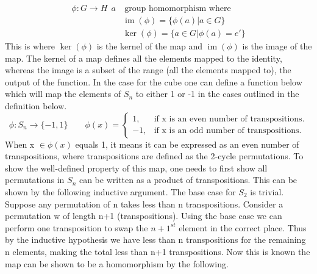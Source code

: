 \documentclass{article}
\newcounter{prop}[section]\setcounter{prop}{0}
\newcounter{lem}[section]\setcounter{lem}{0}
\DeclareMathOperator{\imF}{im}
\DeclareMathOperator{\kerF}{ker}
\begin{document}
\begin{align*}
\phi : G\rightarrow H\ \ a&\ \text{group homomorphism where}\\
&\imF(\phi) = \{\phi(a) | a \in G\}\\
&\kerF(\phi)= \{a\in G |\phi(a) = e'\}
\end{align*}
This is where $\kerF(\phi)$ is the kernel of the map and $\imF(\phi)$ is the image of the map. The kernel of a map defines all the elements mapped to the identity, whereas the image is a subset of the range (all the elements mapped to), the output of the function.
In the case for the cube one can define a function below which will map the elements of $S_{n}$ to either 1 or -1 in the cases outlined in the definition below.
\begin{equation}
\phi : S_{n} \rightarrow \{-1,1\} \qquad
  \phi(x)=\begin{cases}
    1, & \text{if x is an even number of transpositions}.\\
    -1, & \text{if x is an odd number of transpositions}.
  \end{cases}
\end{equation}
When x $\in \phi(x)$ equals 1, it means it can be expressed as an even number of transpositions, where transpositions are defined as the 2-cycle permutations. To show the well-defined property of this map, one needs to first show all permutations in $S_{n}$ can be written as a product of transpositions.%
This can be shown by the following inductive argument. The base case for $S_{2}$ is trivial. Suppose any permutation of n takes less than n transpositions. Consider a permutation w of length n+1 (transpositions). Using the base case we can perform one transposition to swap the $n+1^{st}$ element in the correct place. Thus by the inductive hypothesis we have less than n transpositions for the remaining n elements, making the total less than n+1 transpositions. 
Now this is known the map can be shown to be a homomorphism by the following.
\end{document}
